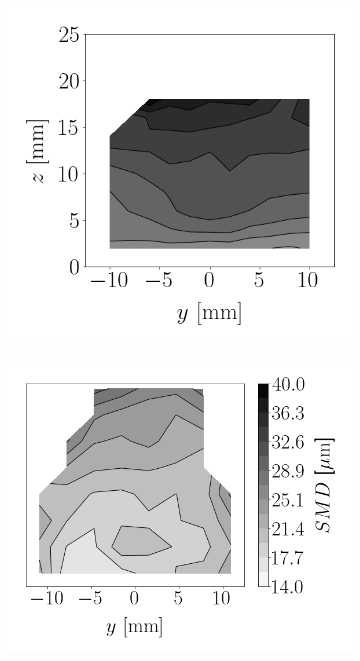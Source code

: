 \begin{figure}[t!]
\vspace*{-0.25in}

\flushleft
\begin{subfigure}[b]{0.2\textwidth}
	\flushleft
   \includegraphics[scale=0.4]{./part2_developments/figures_ch6_lagrangian_JICF/apte_model_calibration_u_vw_lognorm/maps/expe_SMD}
\end{subfigure}
\hspace*{0.27in}
\begin{subfigure}[b]{0.2\textwidth}
	\flushleft
   \includegraphics[scale=0.4]{./part2_developments/figures_ch6_lagrangian_JICF/apte_model_calibration_u_vw_lognorm/maps/k1_0p05_k2_1p0_SMD}

\end{subfigure}
\end{figure}
